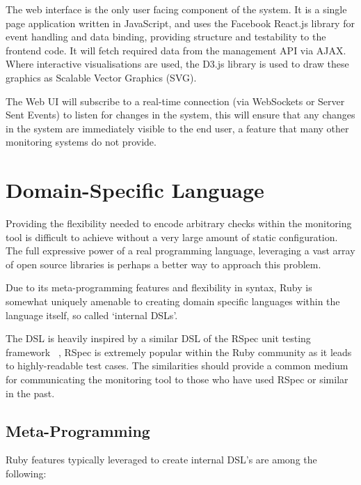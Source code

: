 \documentclass{cshonours}
\begin{document}
The web interface is the only user facing component of the system. It is a single page application written in JavaScript, and uses the Facebook React.js library for event handling and data binding, providing structure and testability to the frontend code. It will fetch required data from the management API via AJAX. Where interactive visualisations are used, the D3.js library is used to draw these graphics as Scalable Vector Graphics (SVG).

The Web UI will subscribe to a real-time connection (via WebSockets or Server Sent Events) to listen for changes in the system, this will ensure that any changes in the system are immediately visible to the end user, a feature that many other monitoring systems do not provide.

\pagebreak
\section{Domain-Specific Language}

Providing the flexibility needed to encode arbitrary checks within the monitoring tool is difficult to achieve without a very large amount of static configuration. The full expressive power of a real programming language, leveraging a vast array of open source libraries is perhaps a better way to approach this problem.

Due to its meta-programming features and flexibility in syntax, Ruby is somewhat uniquely amenable to creating domain specific languages within the language itself, so called `internal DSLs'.

The DSL is heavily inspired by a similar DSL of the RSpec unit testing framework
~\cite{RSpec}, RSpec is extremely popular within the Ruby community as it leads to highly-readable test cases. The similarities should provide a common medium for communicating the monitoring tool to those who have used RSpec or similar in the past.

\subsection{Meta-Programming}

Ruby features typically leveraged to create internal DSL's are among the following:
\end{document}
